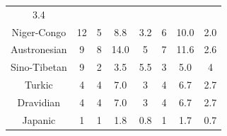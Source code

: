 {\begin{tabular}{|c|c|c|c|c|c|c|c|}
3.4\\ 

Niger-Congo &
	

12& 
	

5& 
	

8.8& 
	

3.2& 
	

6& 
	

10.0& 
	

2.0\\ 

Austronesian &
	

9& 
	

8& 
	

14.0& 
	

5& 
	

7& 
	

11.6& 
	

2.6\\ 

Sino-Tibetan &
	

9& 
	

2& 
	

3.5& 
	

5.5& 
	

3& 
	

5.0& 
	

4\\ 

Turkic &
	

4& 
	

4& 
	

7.0& 
	

3& 
	

4& 
	

6.7& 
	

2.7\\ 

Dravidian &
	

4& 
	

4& 
	

7.0& 
	

3& 
	

4& 
	

6.7& 
	

2.7\\ 

Japanic &
	

1& 
	

1& 
	

1.8& 
	

0.8& 
	

1& 
	

1.7& 
	

0.7\\ 


\end{tabular}}
